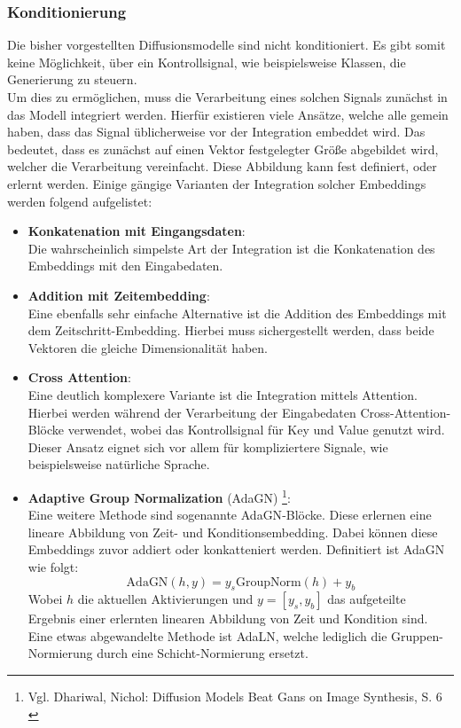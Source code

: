 \subsubsection{Konditionierung}

Die bisher vorgestellten Diffusionsmodelle sind nicht konditioniert. Es gibt somit keine Möglichkeit, über ein Kontrollsignal, wie beispielsweise Klassen, die Generierung zu steuern. \\
Um dies zu ermöglichen, muss die Verarbeitung eines solchen Signals zunächst in das Modell integriert werden. Hierfür existieren viele Ansätze, welche alle gemein haben, dass das Signal üblicherweise vor der Integration embeddet wird. Das bedeutet, dass es zunächst auf einen Vektor festgelegter Größe abgebildet wird, welcher die Verarbeitung vereinfacht. Diese Abbildung kann fest definiert, oder erlernt werden. Einige gängige Varianten der Integration solcher Embeddings werden folgend aufgelistet:
\begin {itemize}
    \item \textbf{Konkatenation mit Eingangsdaten}: \\
    Die wahrscheinlich simpelste Art der Integration ist die Konkatenation des Embeddings mit den Eingabedaten.
    \item \textbf{Addition mit Zeitembedding}: \\
    Eine ebenfalls sehr einfache Alternative ist die Addition des Embeddings mit dem Zeitschritt-Embedding. Hierbei muss sichergestellt werden, dass beide Vektoren die gleiche Dimensionalität haben.
    \item \textbf{Cross Attention}: \\
    Eine deutlich komplexere Variante ist die Integration mittels Attention. Hierbei werden während der Verarbeitung der Eingabedaten Cross-Attention-Blöcke verwendet, wobei das Kontrollsignal für Key und Value genutzt wird. Dieser Ansatz eignet sich vor allem für kompliziertere Signale, wie beispielsweise natürliche Sprache.
    \item \textbf{Adaptive Group Normalization} (AdaGN) \footnote{
        Vgl. Dhariwal, Nichol: Diffusion Models Beat Gans on Image Synthesis, S. 6
        \cite{NEURIPS2021_49ad23d1}
    }: \\
    Eine weitere Methode sind sogenannte \ac{AdaGN}-Blöcke. Diese erlernen eine lineare Abbildung von Zeit- und Konditionsembedding. Dabei können diese Embeddings zuvor addiert oder konkatteniert werden. Definitiert ist \ac{AdaGN} wie folgt:
    \begin{equation}
        \text{AdaGN}(h,y) = y_s \text{GroupNorm}(h) + y_b
    \end{equation}
    Wobei $h$ die aktuellen Aktivierungen und $y=[y_s, y_b]$ das aufgeteilte Ergebnis einer erlernten linearen Abbildung von Zeit und Kondition sind. \\
    Eine etwas abgewandelte Methode ist \ac{AdaLN}, welche lediglich die Gruppen-Normierung durch eine Schicht-Normierung ersetzt.    
\end {itemize}  
